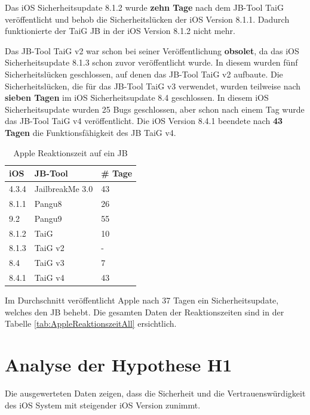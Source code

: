 Das iOS Sicherheitsupdate 8.1.2 wurde \textbf{zehn Tage} nach dem JB-Tool TaiG veröffentlicht und behob die Sicherheitslücken der iOS Version 8.1.1. Dadurch funktionierte der TaiG JB in der iOS Version 8.1.2 nicht mehr.

Das JB-Tool TaiG v2 war schon bei seiner Veröffentlichung \textbf{obsolet}, da das iOS Sicherheitsupdate 8.1.3 schon zuvor veröffentlicht wurde. In diesem wurden fünf Sicherheitslücken geschlossen, auf denen das JB-Tool TaiG v2 aufbaute.
Die Sicherheitslücken, die für das JB-Tool TaiG v3 verwendet, wurden teilweise nach \textbf{sieben Tagen} im iOS Sicherheitsupdate 8.4 geschlossen. In diesem iOS Sicherheitsupdate wurden 25 Bugs geschlossen, aber schon nach einem Tag wurde das JB-Tool TaiG v4 veröffentlicht. Die iOS Version 8.4.1 beendete nach \textbf{43 Tagen} die Funktionsfähigkeit des JB TaiG v4.

\begin{table}[htp!]
    \begin{center}
        \begin{tabular}{| p{10mm} | p{40mm} | p{17mm} |} \hline
            \textbf{iOS} & \textbf{JB-Tool} & \textbf{\# Tage} \\ \hline 
                4.3.4 & JailbreakMe 3.0 & 43 \\ \hline
                8.1.1 & Pangu8 & 26 \\ \hline
                9.2 & Pangu9 & 55 \\ \hline
                8.1.2 & TaiG & 10  \\ \hline
                 8.1.3 & TaiG v2 & - \\ \hline
                  8.4 & TaiG v3 & 7  \\ \hline
                  8.4.1 & TaiG v4 & 43  \\ \hline
        \end{tabular} 
        \caption{Apple Reaktionszeit auf ein JB \protect\footnotemark}
        \label{tab:AppleReaktionszeit}
    \end{center}
\end{table}
Im Durchschnitt veröffentlicht Apple nach 37 Tagen ein Sicherheitsupdate, welches den JB behebt. Die gesamten Daten der Reaktionszeiten sind in der Tabelle \ref{tab:AppleReaktionszeitAll} ersichtlich.  

\section{Analyse der Hypothese H1}
\label{sec:AnalyseHypo}
Die ausgewerteten Daten zeigen, dass die Sicherheit und die Vertrauenswürdigkeit des iOS System mit steigender iOS Version zunimmt. 

